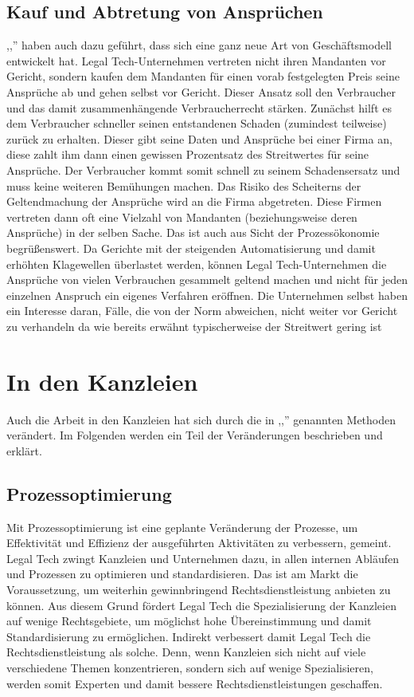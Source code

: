 \subsection{Kauf und Abtretung von Ansprüchen}
,,'' haben auch dazu geführt, dass sich eine ganz neue Art von Geschäftsmodell entwickelt hat. Legal Tech-Unternehmen vertreten nicht ihren Mandanten vor Gericht, sondern kaufen dem Mandanten für einen vorab festgelegten Preis seine Ansprüche ab und gehen selbst vor Gericht. Dieser Ansatz soll den Verbraucher und das damit zusammenhängende Verbraucherrecht stärken. Zunächst hilft es dem Verbraucher schneller seinen entstandenen Schaden (zumindest teilweise) zurück zu erhalten. Dieser gibt seine Daten und Ansprüche bei einer Firma an, diese zahlt ihm dann einen gewissen Prozentsatz des Streitwertes für seine Ansprüche. Der Verbraucher kommt somit schnell zu seinem Schadensersatz und muss keine weiteren Bemühungen machen. Das Risiko des Scheiterns der Geltendmachung der Ansprüche wird an die Firma abgetreten. Diese Firmen vertreten dann oft eine Vielzahl von Mandanten (beziehungsweise deren Ansprüche) in der selben Sache. Das ist auch aus Sicht der Prozessökonomie begrüßenswert. Da Gerichte mit der steigenden Automatisierung und damit erhöhten Klagewellen überlastet werden, können Legal Tech-Unternehmen die Ansprüche von vielen Verbrauchen gesammelt geltend machen und nicht für jeden einzelnen Anspruch ein eigenes Verfahren eröffnen. Die Unternehmen selbst haben ein Interesse daran, Fälle, die von der Norm abweichen, nicht weiter vor Gericht zu verhandeln da wie bereits erwähnt typischerweise der Streitwert gering ist 
\section{In den Kanzleien}
Auch die Arbeit in den Kanzleien hat sich durch die in ,,'' genannten Methoden verändert. Im Folgenden werden ein Teil der Veränderungen beschrieben und erklärt.
\subsection{Prozessoptimierung}
Mit Prozessoptimierung ist eine geplante Veränderung der Prozesse, um Effektivität und Effizienz der ausgeführten Aktivitäten zu verbessern, gemeint. Legal Tech zwingt Kanzleien und Unternehmen dazu, in allen internen Abläufen und Prozessen zu optimieren und standardisieren. Das ist am Markt die Voraussetzung, um weiterhin gewinnbringend Rechtsdienstleistung anbieten zu können. Aus diesem Grund fördert Legal Tech die Spezialisierung der Kanzleien auf wenige Rechtsgebiete, um möglichst hohe Übereinstimmung und damit Standardisierung zu ermöglichen. Indirekt verbessert damit Legal Tech die Rechtsdienstleistung als solche. Denn, wenn Kanzleien sich nicht auf viele verschiedene Themen konzentrieren, sondern sich auf wenige Spezialisieren, werden somit Experten und damit bessere Rechtsdienstleistungen geschaffen.
